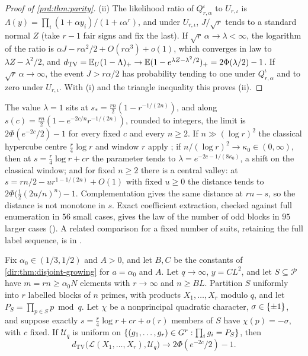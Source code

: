\begin{proof}[Proof of \cref{prd:thm:parity}]
(ii) The likelihood ratio of $Q_{r,\alpha}^\iota$ to $U_{r,\iota}$ is $\Lambda(y)=\prod_i(1+\alpha y_i)/(1+\iota\alpha^r)$, and under
$U_{r,\iota}$, $J/\sqrt r$ tends to a standard normal $Z$ (take $r-1$ fair signs and fix the last). If
$\sqrt r\,\alpha\to\lambda<\infty$, the logarithm of the ratio is $\alpha J-r\alpha^2/2+O(r\alpha^3)+o(1)$, which converges in
law to $\lambda Z-\lambda^2/2$, and
$d_{\mathrm{TV}}=\mathbb{E}_U(1-\Lambda)_+\to\mathbb{E}(1-e^{\lambda Z-\lambda^2/2})_+=2\Phi(\lambda/2)-1$. If $\sqrt r\,\alpha\to\infty$, the
event $J>r\alpha/2$ has probability tending to one under $Q_{r,\alpha}^\iota$ and to zero under $U_{r,\iota}$. With (i)
and the triangle inequality this proves (ii).
\end{proof}

The value $\lambda=1$ sits at $s_*=\frac{rn}2(1-r^{-1/(2n)})$, and along
$s(c)=\frac{rn}2(1-e^{-2c/n}r^{-1/(2n)})$, rounded to integers, the limit is $2\Phi(e^{-2c}/2)-1$ for every fixed $c$
and every $n\ge2$. If $n\gg(\log r)^2$ the classical hypercube centre $\frac r4\log r$ and window $r$ apply
\cite{DiaconisGrahamMorrison1990Asymptotic}; if $n/(\log r)^2\to\kappa_0\in(0,\infty)$, then at $s=\frac r4\log r+cr$
the parameter tends to $\lambda=e^{-2c-1/(8\kappa_0)}$, a shift on the classical window; and for fixed $n\ge2$ there is a
central valley: at $s=rn/2-ur^{1-1/(2n)}+O(1)$ with fixed $u\ge0$ the distance tends to
$2\Phi\bigl(\frac12(2u/n)^n\bigr)-1$. Complementation gives the same distance at $rn-s$, so the distance is not
monotone in $s$. Exact coefficient extraction, checked against full enumeration in $56$ small cases, gives the law
of the number of odd blocks in $95$ larger cases
(). A related comparison for a
fixed number of suits, retaining the full label sequence, is in \cite{Alves2024Simulating}.

\begin{corollary}\label{prd:cor:parityprimes}
Fix $\alpha_0\in(1/3,1/2)$ and $A>0$, and let $B,C$ be the constants of \cref{dir:thm:disjoint-growing} for
$a=\alpha_0$ and $A$. Let $q\to\infty$, $y=CL^2$, and let $S\subseteq\mathcal P$ have $m=rn\ge\alpha_0N$ elements with
$r\to\infty$ and $n\ge BL$. Partition $S$ uniformly into $r$ labelled blocks of $n$ primes, with products
$X_1,\dots,X_r$ modulo $q$, and let $P_S=\prod_{p\in S}p\bmod q$. Let $\chi$ be a nonprincipal quadratic character,
$\sigma\in\{\pm1\}$, and suppose exactly $s=\frac r4\log r+cr+o(r)$ members of $S$ have $\chi(p)=-\sigma$, with $c$
fixed. If $\mathcal U_q$ is uniform on $\{(g_1,\dots,g_r)\in G^r:\prod_ig_i=P_S\}$, then
\[
 d_{\mathrm{TV}}\bigl(\mathcal L(X_1,\dots,X_r),\mathcal U_q\bigr)\to2\Phi(e^{-2c}/2)-1 .
\]
\end{corollary}

